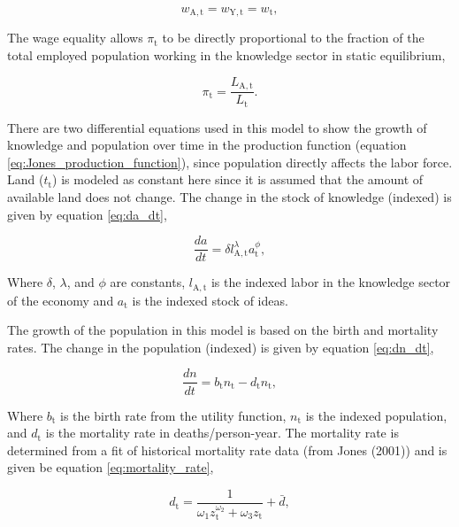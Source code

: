 \documentclass[letterpaper,12pt]{article}
\begin{document}
\begin{equation} \label{eq:wage_equality}
w_\mathrm{A,t} = w_\mathrm{Y,t} = w_\mathrm{t},
\end{equation}

The wage equality allows $\pi_\mathrm{t}$ to be directly proportional to the fraction of the total employed population working in the knowledge sector in static equilibrium,

\begin{equation} \label{eq:pi}
\pi_\mathrm{t} = \frac{L_\mathrm{A,t}}{L_\mathrm{t}}.
\end{equation}

There are two differential equations used in this model to show the growth of knowledge and population over time in the production function (equation \ref{eq:Jones_production_function}), since population directly affects the labor force. Land ($t_\mathrm{t}$) is modeled as constant here since it is assumed that the amount of available land does not change. The change in the stock of knowledge (indexed) is given by equation \ref{eq:da_dt},

\begin{equation} \label{eq:da_dt}
\frac{da}{dt} = \delta l_\mathrm{A,t}^\lambda a_\mathrm{t}^\phi,
\end{equation}

Where $\delta$, $\lambda$, and $\phi$ are constants, $l_\mathrm{A,t}$ is the indexed labor in the knowledge sector of the economy and $a_\mathrm{t}$ is the indexed stock of ideas.

The growth of the population in this model is based on the birth and mortality rates. The change in the population (indexed) is given by equation \ref{eq:dn_dt},

\begin{equation} \label{eq:dn_dt}
\frac{dn}{dt} = b_\mathrm{t} n_\mathrm{t} - d_\mathrm{t} n_\mathrm{t},
\end{equation}

Where $b_\mathrm{t}$ is the birth rate from the utility function, $n_\mathrm{t}$ is the indexed population, and $d_\mathrm{t}$ is the mortality rate in deaths/person-year. The mortality rate is determined from a fit of historical mortality rate data (from Jones (2001)) and is given be equation \ref{eq:mortality_rate},

\begin{equation} \label{eq:mortality_rate}
d_\mathrm{t} = \frac{1}{\omega_\mathrm{1} z_\mathrm{t}^{\omega_\mathrm{2}} + \omega_\mathrm{3} z_\mathrm{t}} + \bar d,
\end{equation}
\end{document}
